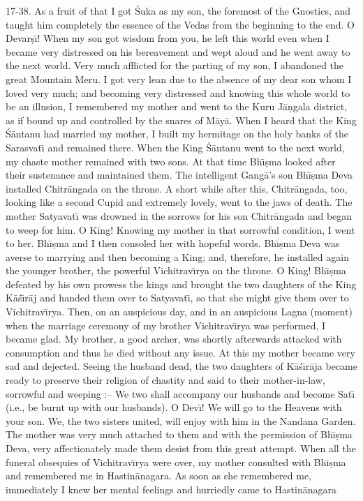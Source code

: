 17-38. As a fruit of that I got \'Suka as my son, the foremost of the Gnostics, and taught him completely the essence of the Vedas from the beginning to the end. O Devar\d{s}\={\i}! When my son got wisdom from you, he left this world even when I became very distressed on his bereavement and wept aloud and he went away to the next world. Very much afflicted for the parting of my son, I abandoned the great Mountain Meru. I got very lean due to the absence of my dear son whom I loved very much; and becoming very distressed and knowing this whole world to be an illusion, I remembered my mother and went to the Kuru J\=a\d{n}gala district, as if bound up and controlled by the snares of M\=ay\=a. When I heard that the King \'S\=antanu had married my mother, I built my hermitage on the holy banks of the Sarasvat\={\i} and remained there. When the King \'S\=antanu went to the next world, my chaste mother remained with two sons. At that time Bh\={\i}\d{s}ma looked after their sustenance and maintained them. The intelligent Gang\=a's son Bh\={\i}\d{s}ma Deva installed Chitr\=angada on the throne. A short while after this, Chitr\=angada, too, looking like a second Cupid and extremely lovely, went to the jaws of death. The mother Satyavat\={\i} was drowned in the sorrows for his son Chitr\=angada and began to weep for him. O King! Knowing my mother in that sorrowful condition, I went to her. Bh\={\i}\d{s}ma and I then consoled her with hopeful words. Bh\={\i}\d{s}ma Deva was averse to marrying and then becoming a King; and, therefore, he installed again the younger brother, the powerful Vichitrav\={\i}rya on the throne. O King! Bh\={\i}\d{s}ma defeated by his own prowess the kings and brought the two daughters of the King K\=a\'s\={\i}r\=aj and handed them over to Satyavat\={\i}, so that she might give them over to Vichitrav\={\i}rya. Then, on an auspicious day, and in an auspicious Lagna (moment) when the marriage ceremony of my brother Vichitrav\={\i}rya was performed, I became glad. My brother, a good archer, was shortly afterwards attacked with consumption and thus he died without any issue. At this my mother became very sad and dejected. Seeing the husband dead, the two daughters of K\=a\'s\={\i}r\=aja became ready to preserve their religion of chastity and said to their mother-in-law, sorrowful and weeping :-- We two shall accompany our husbands and become Sat\={\i} (i.e., be burnt up with our husbands). O Dev\={\i}! We will go to the Heavens with your son. We, the two sisters united, will enjoy with him in the Nandana Garden. The mother was very much attached to them and with the permission of Bh\={\i}\d{s}ma Deva, very affectionately made them desist from this great attempt. When all the funeral obsequies of Vichitrav\={\i}rya were over, my mother consulted with Bh\={\i}\d{s}ma and remembered me in Hastin\=anagara. As soon as she remembered me, immediately I knew her mental feelings and hurriedly came to Hastin\=anagara

